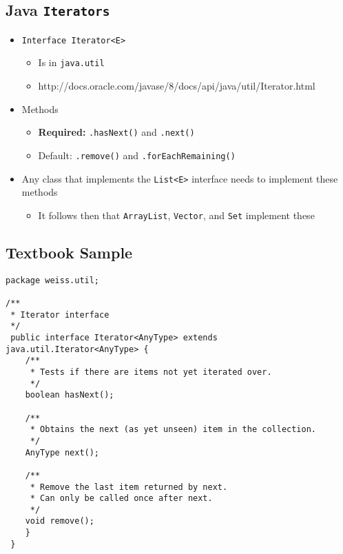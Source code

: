 \documentclass[10pt]{article}
\begin{document}
\subsection*{Java \texttt{Iterators}}
\begin{itemize}
    \item \texttt{Interface Iterator<E>}
    \begin{itemize}
        \item Is in \texttt{java.util}
        \item http://docs.oracle.com/javase/8/docs/api/java/util/Iterator.html
    \end{itemize}
    \item Methods
    \begin{itemize}
        \item \textbf{Required:} \texttt{.hasNext()} and \texttt{.next()}
        \item Default: \texttt{.remove()} and \texttt{.forEachRemaining()}
    \end{itemize}
    \item Any class that implements the \texttt{List<E>} interface needs to implement these methods
    \begin{itemize}
        \item It follows then that \texttt{ArrayList}, \texttt{Vector}, and \texttt{Set} implement these
    \end{itemize}
\end{itemize}

\subsection*{Textbook Sample}
\begin{verbatim}
package weiss.util;

/**
 * Iterator interface
 */
 public interface Iterator<AnyType> extends java.util.Iterator<AnyType> {
    /**
     * Tests if there are items not yet iterated over.
     */
    boolean hasNext();
    
    /**
     * Obtains the next (as yet unseen) item in the collection.
     */
    AnyType next();
    
    /**
     * Remove the last item returned by next.
     * Can only be called once after next.
     */
    void remove();
    }
 }
\end{verbatim}
\end{document}
